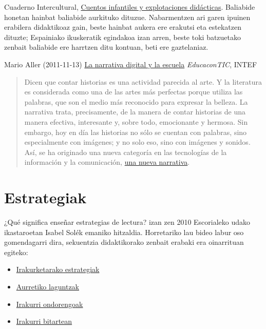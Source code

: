 \documentclass[]{book}
\providecommand{\tightlist}{%
  \setlength{\itemsep}{0pt}\setlength{\parskip}{0pt}}
\begin{document}
Cuaderno Intercultural, \href{http://www.cuadernointercultural.com/materiales/lectura/cuentos-fabulas-y-leyendas/\#cuentosdidact}{Cuentos infantiles y explotaciones didácticas}.
Baliabide honetan hainbat baliabide aurkituko dituzue. Nabarmentzen ari garen ipuinen erabilera didaktikoaz gain, beste hainbat aukera ere erakutsi eta estekatzen dituzte; Espainiako ikuskeratik egindakoa izan arren, beste toki batzuetako zenbait baliabide ere harrtzen ditu kontuan, beti ere gaztelaniaz.

Mario Aller (2011-11-13) \href{http://www.educacontic.es/blog/la-narrativa-digital-y-la-escuela}{La narrativa digital y la escuela} \emph{EducaconTIC}, INTEF

\begin{quote}
Dicen que contar historias es una actividad parecida al arte. Y la
literatura es considerada como una de las artes más perfectas porque utiliza las palabras,
que son el medio más reconocido para expresar la belleza. La narrativa
trata, precisamente, de la manera de contar historias de una manera
efectiva, interesante y, sobre todo, emocionante y hermosa. Sin embargo,
hoy en día las historias no sólo se cuentan con palabras, sino
especialmente con imágenes; y no solo eso, sino con imágenes y sonidos.
Así, se ha originado una nueva categoría en las tecnologías de la
información y la comunicación, \href{http://www.storycenter.org/}{una nueva narrativa}.
\end{quote}

\hypertarget{estrategiak}{%
\section{Estrategiak}\label{estrategiak}}

¿Qué significa enseñar estrategias de lectura? izan zen 2010 Escorialeko udako ikastaroetan Isabel Solék emaniko hitzaldia. Horretariko lau bideo labur oso gomendagarri dira, sekuentzia didaktikorako zenbait erabaki era oinarrituan egiteko:

\begin{itemize}
\tightlist
\item
  \href{http://leer.es/web/leer/-/estrategias-de-lectura-1-introduccion}{Irakurketarako estrategiak}
\item
  \href{http://leer.es/web/leer/-/estrategias-de-lectura-10-ayudas-previas}{Aurretiko laguntzak}
\item
  \href{http://leer.es/web/leer/-/estrategias-de-lectura-12-despues-de-leer}{Irakurri ondorengoak}
\item
  \href{http://leer.es/web/leer/-/estrategias-de-lectura-11-durante-la-lectura}{Irakurri bitartean}
\end{itemize}
\end{document}
